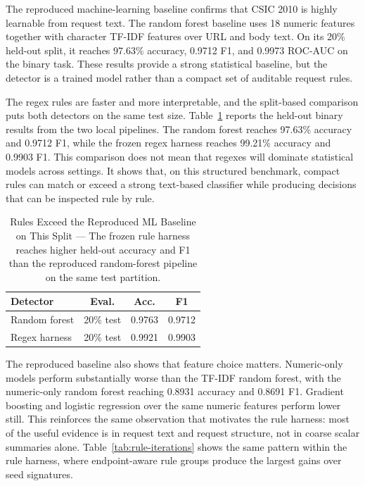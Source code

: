 \documentclass[letterpaper,twocolumn,10pt]{article}
\begin{document}
The reproduced machine-learning baseline confirms that CSIC 2010 is highly learnable from request text. The random forest baseline uses 18 numeric features together with character TF-IDF features over URL and body text. On its 20\% held-out split, it reaches 97.63\% accuracy, 0.9712 F1, and 0.9973 ROC-AUC on the binary task. These results provide a strong statistical baseline, but the detector is a trained model rather than a compact set of auditable request rules.

The regex rules are faster and more interpretable, and the split-based comparison puts both detectors on the same test size. Table~\ref{tab:model-comparison} reports the held-out binary results from the two local pipelines. The random forest reaches 97.63\% accuracy and 0.9712 F1, while the frozen regex harness reaches 99.21\% accuracy and 0.9903 F1. This comparison does not mean that regexes will dominate statistical models across settings. It shows that, on this structured benchmark, compact rules can match or exceed a strong text-based classifier while producing decisions that can be inspected rule by rule.

\begin{table}[t]
\centering
\begin{tabular}{lccc}
\toprule
Detector & Eval. & Acc. & F1 \\
\midrule
Random forest & 20\% test & 0.9763 & 0.9712 \\
Regex harness & 20\% test & 0.9921 & 0.9903 \\
\bottomrule
\end{tabular}
\caption{Rules Exceed the Reproduced ML Baseline on This Split --- The frozen rule harness reaches higher held-out accuracy and F1 than the reproduced random-forest pipeline on the same test partition.}
\label{tab:model-comparison}
\end{table}

The reproduced baseline also shows that feature choice matters. Numeric-only models perform substantially worse than the TF-IDF random forest, with the numeric-only random forest reaching 0.8931 accuracy and 0.8691 F1. Gradient boosting and logistic regression over the same numeric features perform lower still. This reinforces the same observation that motivates the rule harness: most of the useful evidence is in request text and request structure, not in coarse scalar summaries alone. Table~\ref{tab:rule-iterations} shows the same pattern within the rule harness, where endpoint-aware rule groups produce the largest gains over seed signatures.
\end{document}
